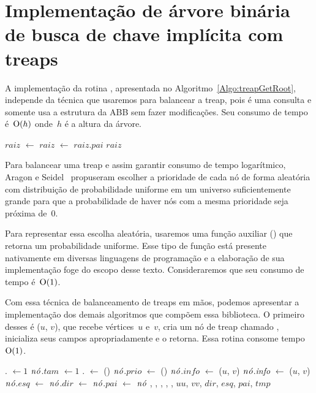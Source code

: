 \section{Implementação de árvore binária de busca de chave implícita com treaps}
\label{sec:imple-treap}
A implementação da rotina \treapGetRoot{}, apresentada no Algoritmo~\ref{Algo:treapGetRoot}, independe da técnica que usaremos para balancear a treap,
pois é uma consulta e somente usa a estrutura da ABB sem fazer modificações.
Seu consumo de tempo é~$\mathrm{O}(h)$ onde~$h$ é a altura da árvore.

\begin{algorithm}[htb]
\caption{\treapGetRoot()}
\label{Algo:treapGetRoot}
\begin{algorithmic}[1]
\State $raiz$ $\gets$ 
\State  $raiz$ $\gets$  $raiz$.$pai$
\EndWhile
\State \Return $raiz$
\end{algorithmic}
\end{algorithm}

Para balancear uma treap e assim garantir consumo de tempo logarítmico, Aragon e Seidel~\cite{AragonSeidel1989, AragonSeidel1996} propuseram escolher a prioridade de cada nó de forma aleatória com distribuição de probabilidade uniforme em um universo suficientemente grande para que a probabilidade de haver nós com a mesma prioridade seja próxima de~$0$.


Para representar essa escolha aleatória, usaremos uma função auxiliar \random() que retorna um  probabilidade uniforme. Esse tipo de função está presente nativamente em diversas linguagens de programação e a elaboração de sua implementação foge do escopo desse texto. Consideraremos que seu consumo de tempo é~$\mathrm{O}(1)$.

Com essa técnica de balanceamento de treaps em mãos, podemos apresentar a implementação dos demais algoritmos que compõem essa biblioteca.
O primeiro desses é \treapCreate($u$, $v$), que recebe vértices~$u$ e~$v$, cria um nó de treap chamado , inicializa seus campos apropriadamente e o retorna.
Essa rotina consome tempo~$\mathrm{O}(1)$. 

\begin{algorithm}
\caption{\treapCreate($u$, $v$)}
\label{Algo:TREAPbuild}
\begin{algorithmic}[1]
\State {}. $\gets 1$ \Comment{}
\State $\mathit{n\acute{o}}$.$tam$ $\gets 1$ \Comment {}
\State {}. $\gets$ \random() \Comment{}
\State $\mathit{n\acute{o}}$.$prio$ $\gets$ \random() \Comment{}
\State $\mathit{n\acute{o}}$.$info$ $\gets$ ($u$, $v$) 
\State $\mathit{n\acute{o}}$.\textit{info} $\gets$ ($u$, $v$)
\State $\mathit{n\acute{o}}$.$esq$ $\gets$ $\mathit{n\acute{o}}$.$dir$ $\gets$ $\mathit{n\acute{o}}$.$pai$ $\gets$ \Nil
\State \Return $\mathit{n\acute{o}}$
\State {}, , , , ,  \Comment{}
\State $uu$, $vv$, $dir$, $esq$, $pai$, $tmp$  \Comment{}
\end{algorithmic}
\end{algorithm}

